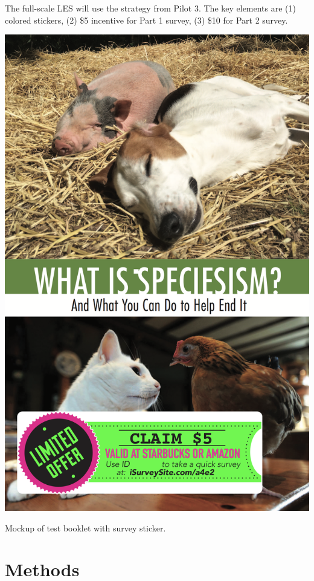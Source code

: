 \documentclass{tufte-handout}
\begin{document}
The full-scale LES will use the strategy from Pilot 3. The key elements are
(1) colored stickers, (2) \$5 incentive for Part 1 survey, (3) \$10 for Part 2
survey. 

\begin{marginfigure}[1 in]%
  \includegraphics[width=\textwidth]{les_booklet_mockup.png}
  \caption{Mockup of test booklet with survey sticker.}
  \label{fig:lesbooklet}
\end{marginfigure}

\section{Methods}
\end{document}
